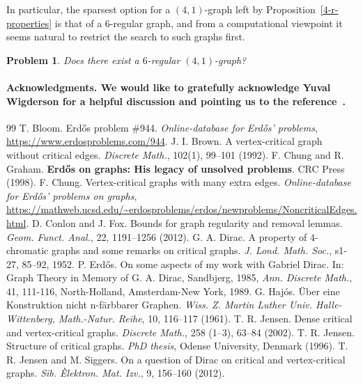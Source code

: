 \documentclass[a4paper,10pt,hidelinks]{amsart}
\newtheorem{problem}[theorem]{Problem}
\theoremstyle{definition}
\begin{document}
In particular, the sparsest option for a $(4,1)$-graph left by Proposition~\ref{4-r-properties} is that of a $6$-regular graph, and from a computational viewpoint it seems natural to restrict the search to such graphs first.
\begin{problem}
    Does there exist a $6$-regular $(4,1)$-graph?
\end{problem}
\medskip

\paragraph*{\textbf{Acknowledgments.} We would like to gratefully acknowledge Yuval Wigderson for a helpful discussion and pointing us to the reference~\cite{conlonfox}.}

\begin{thebibliography}{99}
 T. Bloom. Erd\H{o}s problem $\#$944. \emph{Online-database for Erd\H{o}s' problems}, \url{https://www.erdosproblems.com/944}.
 J. I. Brown. A vertex-critical graph without critical edges. \emph{Discrete Math.}, 102(1), 99--101 (1992). 
 F. Chung and R. Graham. \textbf{Erd\H{o}s on graphs: His legacy of unsolved problems}. CRC Press (1998). 
 F. Chung. Vertex-critical graphs with many extra edges. \emph{Online-database for Erd\H{o}s' problems on graphs}, \url{https://mathweb.ucsd.edu/~erdosproblems/erdos/newproblems/NoncriticalEdges.html}.
 D. Conlon and J. Fox. Bounds for graph regularity and removal lemmas. \emph{Geom. Funct. Anal.}, 22, 1191--1256 (2012). 
 G. A. Dirac. A property of $4$-chromatic graphs and some remarks on critical graphs. \emph{J. Lond. Math. Soc.}, s1-27, 85--92, 1952.
 P. Erd\H{o}s. On some aspects of my work with Gabriel Dirac. In: Graph Theory in Memory of G. A. Dirac, Sandbjerg, 1985, \emph{Ann. Discrete Math.}, 41, 111-116, North-Holland, Amsterdam-New York, 1989. 
 G. Haj\'{o}s. \"{U}ber eine Konstruktion nicht n-f\"{a}rbbarer Graphen. \emph{Wiss. Z. Martin Luther
Univ. Halle-Wittenberg, Math.-Natur. Reihe}, 10, 116--117 (1961).
 T. R. Jensen. Dense critical and vertex-critical graphs. \emph{Discrete Math.}, 258 (1--3), 63--84 (2002). 
 T. R. Jensen. Structure of critical graphs. \emph{PhD thesis}, Odense University, Denmark (1996). 
 T. R. Jensen and M. Siggers. On a question of Dirac on critical and vertex-critical graphs. \emph{Sib. \`Elektron. Mat. Izv.}, 9, 156--160 (2012). 

\end{thebibliography}
\end{document}
